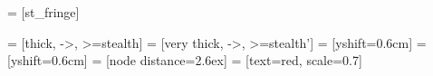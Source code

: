  = 	%
								[st_fringe]




 = [thick, ->, >=stealth]
 = [very thick, ->, >=stealth']
 = [yshift=0.6cm]
 = [yshift=0.6cm]
 = [node distance=2.6ex]
 = [text=red, scale=0.7]
